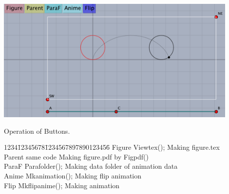 \documentclass[papersize,a4paper,12pt]{article}
\begin{document}
\vspace{\baselineskip}
 \hspace{10mm} \includegraphics[bb=0 0 732.04 376.02 , width=12cm]{Fig/mvgaiyou01.pdf}

Operation of Buttons.

\begin{tabbing}
1234\=12345678\=1234567897890123456\=\kill
  \>   Figure  \> Viewtex(); \> Making figure.tex\\
  \>   Parent   \> same code   \>Making figure.pdf by Figpdf() \\
  \>   ParaF \> Parafolder(); \> Making data folder of animation data\\
  \>   Anime  \>  Mkanimation(); \> Making flip animation\\
  \>   Flip   \> Mkflipanime();  \>Making  animation
\end{tabbing}
\end{document}
